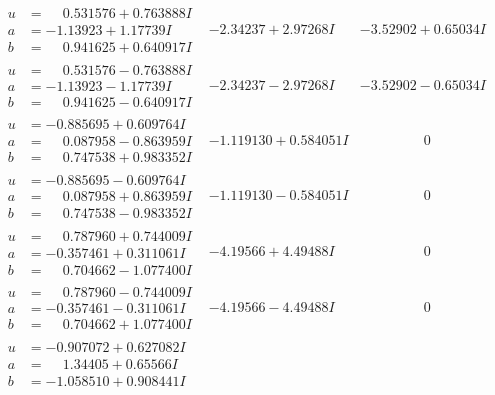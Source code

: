 \documentclass[1p]{elsarticle_modified}
\theoremstyle{definition}
\begin{document}
$$\begin{array}{c|c|c}
\begin{aligned}
u &= \phantom{-}0.531576 + 0.763888 I \\
a &= -1.13923 + 1.17739 I \\
b &= \phantom{-}0.941625 + 0.640917 I\end{aligned}
 & -2.34237 + 2.97268 I & -3.52902 + 0.65034 I \\ \hline\begin{aligned}
u &= \phantom{-}0.531576 - 0.763888 I \\
a &= -1.13923 - 1.17739 I \\
b &= \phantom{-}0.941625 - 0.640917 I\end{aligned}
 & -2.34237 - 2.97268 I & -3.52902 - 0.65034 I \\ \hline\begin{aligned}
u &= -0.885695 + 0.609764 I \\
a &= \phantom{-}0.087958 - 0.863959 I \\
b &= \phantom{-}0.747538 + 0.983352 I\end{aligned}
 & -1.119130 + 0.584051 I & \phantom{-0.000000 } 0 \\ \hline\begin{aligned}
u &= -0.885695 - 0.609764 I \\
a &= \phantom{-}0.087958 + 0.863959 I \\
b &= \phantom{-}0.747538 - 0.983352 I\end{aligned}
 & -1.119130 - 0.584051 I & \phantom{-0.000000 } 0 \\ \hline\begin{aligned}
u &= \phantom{-}0.787960 + 0.744009 I \\
a &= -0.357461 + 0.311061 I \\
b &= \phantom{-}0.704662 - 1.077400 I\end{aligned}
 & -4.19566 + 4.49488 I & \phantom{-0.000000 } 0 \\ \hline\begin{aligned}
u &= \phantom{-}0.787960 - 0.744009 I \\
a &= -0.357461 - 0.311061 I \\
b &= \phantom{-}0.704662 + 1.077400 I\end{aligned}
 & -4.19566 - 4.49488 I & \phantom{-0.000000 } 0 \\ \hline\begin{aligned}
u &= -0.907072 + 0.627082 I \\
a &= \phantom{-}1.34405 + 0.65566 I \\
b &= -1.058510 + 0.908441 I\end{aligned}

\end{array}$$
\end{document}
